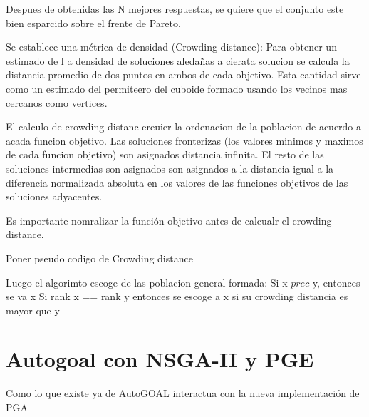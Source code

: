 Despues de obtenidas las N mejores respuestas, se quiere que el conjunto este bien esparcido sobre el frente de Pareto. 

Se establece una m\'etrica de densidad (Crowding distance): Para obtener un estimado de l a densidad de soluciones aleda\~nas a cierata solucion se calcula la distancia promedio de dos puntos  en ambos  de cada objetivo. Esta cantidad sirve como un estimado del permiteero del cuboide formado usando los vecinos mas cercanos como vertices.

El calculo de crowding distanc ereuier la ordenacion de la poblacion de acuerdo a acada funcion objetivo. Las soluciones fronterizas (los valores minimos y maximos de cada funcion objetivo) son asignados distancia infinita. El resto de las soluciones intermedias son asignados son asignados a la distancia igual a la diferencia normalizada absoluta en los valores de las funciones objetivos de las soluciones adyacentes.

Es importante nomralizar la funci\'on objetivo antes de calcualr el crowding distance.

Poner pseudo codigo de Crowding distance

Luego el algorimto escoge de las poblacion general formada:
Si x $prec$ y, entonces se va x
Si rank x == rank y entonces se escoge a x si su crowding distancia es mayor que y

\section{Autogoal con NSGA-II y PGE}

Como lo que existe ya de AutoGOAL interactua con la nueva implementaci\'on de PGA

